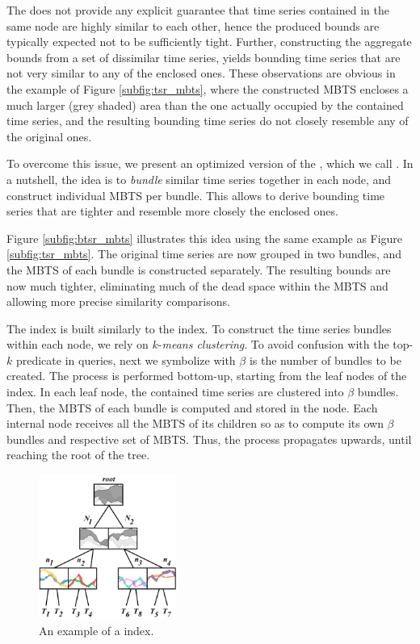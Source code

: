 The \tsr does not provide any explicit guarantee that time series contained in the same node are highly similar to each other, hence the produced bounds are typically expected not to be sufficiently tight. Further, constructing the aggregate bounds from a set of dissimilar time series, yields bounding time series that are not very similar to any of the enclosed ones. These observations are obvious in the example of Figure \ref{subfig:tsr_mbts}, where the constructed MBTS encloses a much larger (grey shaded) area than the one actually occupied by the contained time series, and the resulting bounding time series do not closely resemble any of the original ones.

To overcome this issue, we present an optimized version of the \tsr, which we call \btsr. In a nutshell, the idea is to \emph{bundle} similar time series together in each node, and construct individual MBTS per bundle. This allows to derive bounding time series that are tighter and resemble more closely the enclosed ones. 

\begin{myexample}
 Figure \ref{subfig:btsr_mbts} illustrates this idea using the same example as Figure \ref{subfig:tsr_mbts}. The original time series are now grouped in two bundles, and the MBTS of each bundle is constructed separately. The resulting bounds are now much tighter, eliminating much of the dead space within the MBTS and allowing more precise similarity comparisons.
\end{myexample}

The \btsr index is built similarly to the \tsr index. To construct the time series bundles within each node, we rely on $k$-{\em means clustering}. To avoid confusion with the top-$k$ predicate in queries, next we symbolize with $\beta$ is the number of bundles to be created. The process is performed bottom-up, starting from the leaf nodes of the index. In each leaf node, the contained time series are clustered into $\beta$ bundles. Then, the MBTS of each bundle is computed and stored in the node. Each internal node receives all the MBTS of its children so as to compute its own $\beta$ bundles and respective set of MBTS. Thus, the process propagates upwards, until reaching the root of the tree.

\begin{figure}[!tb]
 \centering
 \includegraphics[width=0.4\textwidth]{figures/btsr_tree.png}
 \caption{An example of a \btsr index.}
 \label{fig:btsr_tree}
\end{figure}

